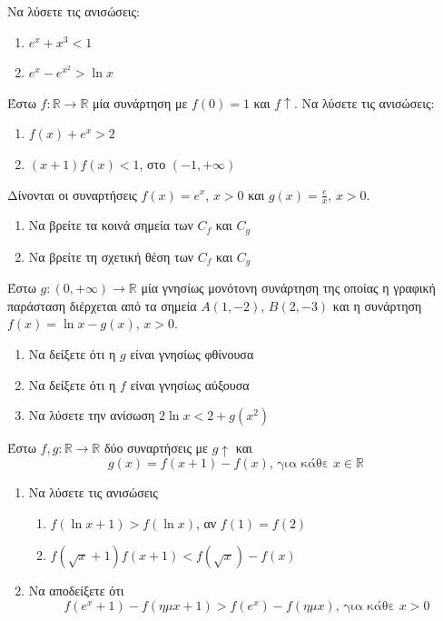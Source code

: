 \documentclass{presentation}
\begin{document}
\begin{askisi}
  Να λύσετε τις ανισώσεις:
  \begin{enumerate}
    \item $e^x+x^3<1$ \pause
    \item $e^x-e^{x^2}>\ln x$
  \end{enumerate}
\end{askisi}

\begin{askisi}
  Έστω $f:\mathbb{R}\to\mathbb{R}$ μία συνάρτηση με $f(0)=1$ και $f\uparrow$. Να λύσετε τις ανισώσεις:
  \begin{enumerate}
    \item $f(x)+e^x>2$ \pause
    \item $(x+1)f(x)<1$, στο $(-1,+\infty)$
  \end{enumerate}
\end{askisi}

\begin{askisi}
  Δίνονται οι συναρτήσεις $f(x)=e^x$, $x>0$ και $g(x)=\frac{e}{x}$, $x>0$.
  \begin{enumerate}
    \item Να βρείτε τα κοινά σημεία των $C_f$ και $C_g$ \pause
    \item Να βρείτε τη σχετική θέση των $C_f$ και $C_g$
  \end{enumerate}
\end{askisi}

\begin{askisi}
  Έστω $g:(0,+\infty)\to\mathbb{R}$ μία γνησίως μονότονη συνάρτηση της οποίας η γραφική παράσταση διέρχεται από τα σημεία $Α(1,-2)$, $Β(2,-3)$ και η συνάρτηση $f(x)=\ln x-g(x)$, $x>0$.
  \begin{enumerate}
    \item Να δείξετε ότι η $g$ είναι γνησίως φθίνουσα \pause
    \item Να δείξετε ότι η $f$ είναι γνησίως αύξουσα \pause
    \item Να λύσετε την ανίσωση $2\ln x<2+g(x^2)$
  \end{enumerate}
\end{askisi}

\begin{askisi}
  Έστω $f,g:\mathbb{R}\to\mathbb{R}$ δύο συναρτήσεις με $g\uparrow$ και
  $$g(x)=f(x+1)-f(x)\text{, για κάθε } x\in\mathbb{R}$$
  \begin{enumerate}
    \item Να λύσετε τις ανισώσεις
          \begin{enumerate}
            \item $f(\ln x+1)>f(\ln x)$, αν $f(1)=f(2)$ \pause
            \item $f(\sqrt{x}+1)f(x+1)<f(\sqrt{x})-f(x)$ \pause
          \end{enumerate}
    \item Να αποδείξετε ότι  \pause
          $$f(e^x+1)-f(ημ x+1)>f(e^x)-f(ημ x)\text{, για κάθε } x>0$$
  \end{enumerate}
\end{askisi}
\end{document}
